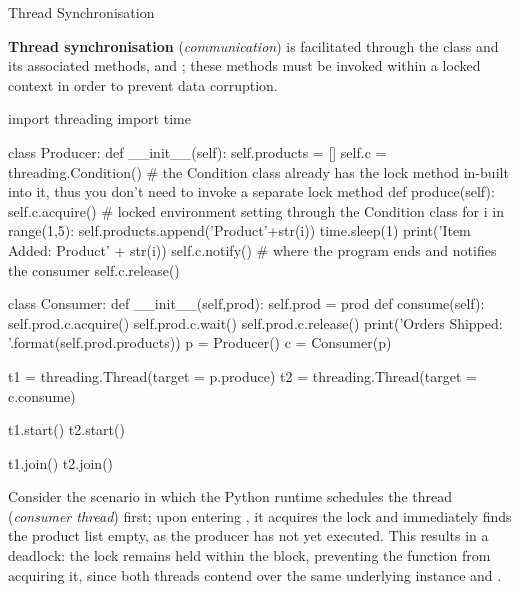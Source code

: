 \documentclass[10pt]{article}
\begin{document}
      \begin{core}{Thread Synchronisation}

        \textbf{Thread synchronisation} (\textit{communication}) is facilitated through the  class and its associated methods,  and ; these methods must be invoked within a locked context in order to prevent data corruption.

        \begin{pyconsole}

          import threading
          import time

          class Producer:
              def __init__(self):
                  self.products = []
                  self.c = threading.Condition() # the Condition class already has the lock method in-built into it, thus you don't need to invoke a separate lock method
              def produce(self):
                  self.c.acquire() # locked environment setting through the Condition class
                  for i in range(1,5):
                      self.products.append('Product'+str(i))
                      time.sleep(1)
                      print('Item Added: Product' + str(i))
                  self.c.notify() # where the program ends and notifies the consumer
                  self.c.release()

          class Consumer:
              def __init__(self,prod):
                  self.prod = prod
              def consume(self):
                  self.prod.c.acquire()
                  self.prod.c.wait() 
                  self.prod.c.release()
                  print('Orders Shipped: {}'.format(self.prod.products))
          p = Producer()
          c = Consumer(p)

          t1 = threading.Thread(target = p.produce)
          t2 = threading.Thread(target = c.consume)

          t1.start()
          t2.start()

          t1.join()
          t2.join()

        \end{pyconsole}

        Consider the scenario in which the Python runtime schedules the  thread (\textit{consumer thread}) first; upon entering , it acquires the lock and immediately finds the product list empty, as the producer has not yet executed. This results in a deadlock: the lock remains held within the  block, preventing the  function from acquiring it, since both threads contend over the same underlying  instance  and .


\end{core}
\end{document}
